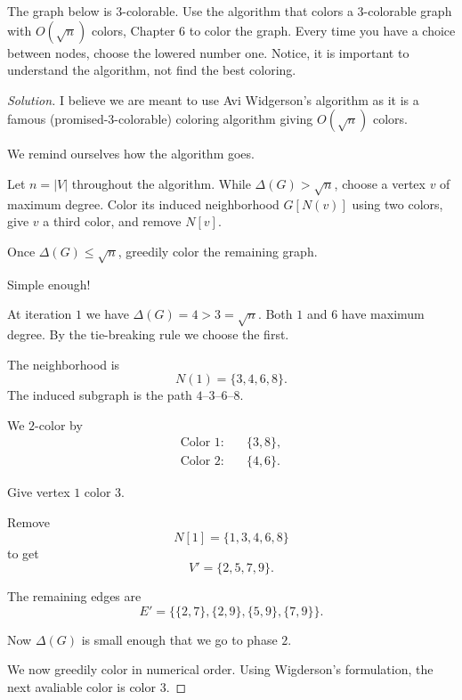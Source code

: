 \documentclass[11pt]{article}
\begin{document}
\begin{prob*}[5, Problem 1]
    The graph below is $3$-colorable. Use 
    the algorithm that colors a $3$-colorable graph 
    with $O(\sqrt n)$ colors, 
    Chapter $6$ to color the graph. 
    Every time you have a choice between 
    nodes, choose the lowered number one. 
    Notice, it is important to understand 
    the algorithm, not find the best coloring. 
\end{prob*}
\begin{proof}[Solution]
    I believe we are meant to use Avi Widgerson's 
    algorithm as it is a 
    famous (promised-$3$-colorable) 
    coloring algorithm giving $O(\sqrt n)$ colors. 

    We remind ourselves how the algorithm goes. 

    Let $n = |V|$ throughout the algorithm. 
    While $\Delta(G) > \sqrt n$, choose a vertex $v$ 
    of maximum degree. Color its induced neighborhood 
    $G[N(v)]$ using two colors, give $v$ a 
    third color, and remove $N[v]$. 

    Once $\Delta(G) \leq \sqrt n$, greedily color 
    the remaining graph. 

    Simple enough! 

    At iteration $1$ we have 
    $\Delta(G) = 4 > 3 = \sqrt n$. 
    Both $1$ and $6$ have maximum degree. By the 
    tie-breaking rule we choose the first. 

    The neighborhood is 
    \[
        N(1) = \{3,4,6,8\}. 
    \]
    The induced subgraph is the path 
    $4$--$3$--$6$--$8$. 

    We $2$-color by 
    \[
        \begin{aligned}
        \text{Color 1}:&\quad \{3,8\},\\
        \text{Color 2}:&\quad \{4,6\}.
        \end{aligned}
    \]

    Give vertex $1$ color $3$. 

    Remove 
    \[
        N[1]=\{1,3,4,6,8\}
    \]
    to get 
    \[
        V'=\{2,5,7,9\}.
    \]


    The remaining edges are 
    \[
        E'=\{\{2,7\},\{2,9\},\{5,9\},\{7,9\}\}.
    \]

    Now $\Delta(G)$ is small enough that we 
    go to phase $2$. 

    We now greedily color in numerical order. 
    Using Wigderson's formulation, the 
    next avaliable color is color $3$. 


\end{proof}
\end{document}
